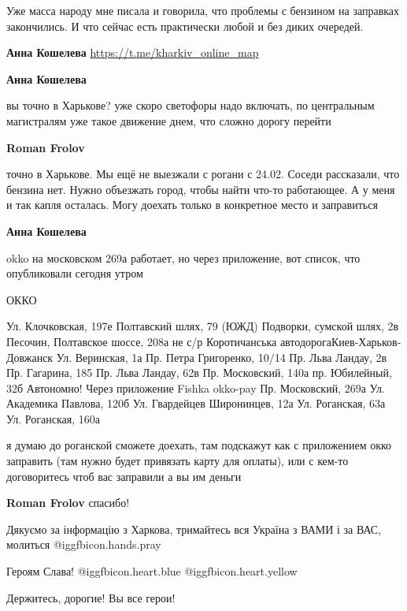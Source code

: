 \begin{itemize}
\begin{itemize}
Уже масса народу мне писала и говорила, что проблемы с бензином на заправках закончились. И что сейчас есть практически любой и без диких очередей.

\textbf{Анна Кошелева} \url{https://t.me/kharkiv_online_map}

\textbf{Анна Кошелева} 

вы точно в Харькове? уже скоро светофоры надо включать, по центральным
магистралям уже такое движение днем, что сложно дорогу перейти

\textbf{Roman Frolov} 

точно в Харькове. Мы ещё не выезжали с рогани с 24.02. Соседи рассказали, что
бензина нет. Нужно объезжать город, чтобы найти что-то работающее. А у меня и
так капля осталась. Могу доехать только в конкретное место и заправиться

\textbf{Анна Кошелева} 

okko на московском 269а работает, но через приложение, вот список, что опубликовали сегодня утром

ОККО

\obeycr
Ул. Клочковская, 197е
Полтавский шлях, 79 (ЮЖД)
Подворки, сумской шлях, 2в
Песочин, Полтавское шоссе, 208а не
с/р Коротичанська автодорогаКиев-Харьков-Довжанск
Ул. Веринская, 1а
Пр. Петра Григоренко, 10/14
Пр. Льва Ландау, 2в
Пр. Гагарина, 185
Пр. Льва Ландау, 62в
Пр. Московский, 140а
пр. Юбилейный, 32б
Автономно! Через приложение Fishka okko-pay
Пр. Московский, 269а
Ул. Академика Павлова, 120б
Ул. Гвардейцев Широнинцев, 12а
Ул. Роганская, 63а
Ул. Роганская, 160а
\restorecr


я думаю до роганской сможете доехать, там подскажут как с приложением окко
заправить (там нужно будет привязать карту для оплаты), или с кем-то
договоритесь чтоб вас заправили а вы им деньги

\textbf{Roman Frolov} спасибо!
\end{itemize} %


Дякуємо за інформацію з Харкова, тримайтесь вся Україна з ВАМИ і за ВАС,
молиться @igg{fbicon.hands.pray} 

Героям Слава! @igg{fbicon.heart.blue}  @igg{fbicon.heart.yellow} 

Держитесь, дорогие! Вы все герои!


\end{itemize}
